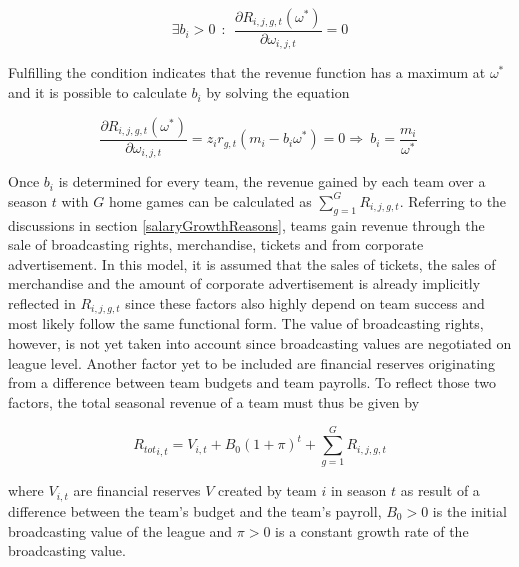 \documentclass[12pt, a4paper]{article}
\begin{document}
\begin{equation}
\exists b_i>0 \ \ : \ \ \frac{\partial R_{i,j,g,t}\left(\omega^\ast\right)}{\partial\omega_{i,j,t}}=0
\end{equation}

\noindent
Fulfilling the condition indicates that the revenue function has a maximum at $\omega^\ast$ and it is possible to calculate $b_i$ by solving the equation 

\begin{equation}
\label{eq:competitiveBalanceEffect}
\frac{\partial R_{i,j,g,t}\left(\omega^\ast\right)}{\partial\omega_{i,j,t}}=z_ir_{g,t}(m_i-b_i\omega^\ast)=0\Rightarrow\ b_i=\frac{m_i}{\omega^\ast}\ 
\end{equation}

\noindent
Once $b_i$ is determined for every team, the revenue gained by each team over a season $t$ with $G$ home games can be calculated as $\sum_{g=1}^{G}R_{i,j,g,t}$. Referring to the discussions in section \ref{salaryGrowthReasons}, teams gain revenue through the sale of broadcasting rights, merchandise, tickets and from corporate advertisement. In this model, it is assumed that the sales of tickets, the sales of merchandise and the amount of corporate advertisement is already implicitly reflected in $R_{i,j,g,t}$ since these factors also highly depend on team success and most likely follow the same functional form. The value of broadcasting rights, however, is not yet taken into account since broadcasting values are negotiated on league level. Another factor yet to be included are financial reserves originating from a difference between team budgets and team payrolls. To reflect those two factors, the total seasonal revenue of a team must thus be given by

\begin{equation}
\label{eq:seasonalRevenue}
{R_{tot}}_{i,t}=V_{i,t}+B_0(1+\pi)^t+\sum_{g=1}^{G}R_{i,j,g,t}
\end{equation}

\noindent
where $V_{i,t}$ are financial reserves $V$ created by team $i$ in season $t$ as result of a difference between the team's budget and the team's payroll, $B_0>0$ is the initial broadcasting value of the league and $\pi>0$ is a constant growth rate of the broadcasting value.
\end{document}
